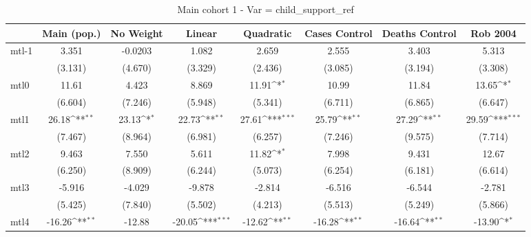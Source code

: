 \documentclass{article}
\begin{document}
{
\def\sym#1{\ifmmode^{#1}\else\(^{#1}\)\fi}
\begin{longtable}{l*{7}{c}}
\caption{Main cohort 1 - Var = child\_support\_ref}\\
\hline\hline\endfirsthead\hline\endhead\hline\endfoot\endlastfoot
                &\multicolumn{1}{c}{Main (pop.)}&\multicolumn{1}{c}{No Weight}&\multicolumn{1}{c}{Linear}&\multicolumn{1}{c}{Quadratic}&\multicolumn{1}{c}{Cases Control}&\multicolumn{1}{c}{Deaths Control}&\multicolumn{1}{c}{Rob 2004}\\
\hline
mtl-1           &    3.351         &  -0.0203         &    1.082         &    2.659         &    2.555         &    3.403         &    5.313         \\
                &  (3.131)         &  (4.670)         &  (3.329)         &  (2.436)         &  (3.085)         &  (3.194)         &  (3.308)         \\
mtl0            &    11.61         &    4.423         &    8.869         &    11.91\sym{*}  &    10.99         &    11.84         &    13.65\sym{*}  \\
                &  (6.604)         &  (7.246)         &  (5.948)         &  (5.341)         &  (6.711)         &  (6.865)         &  (6.647)         \\
mtl1            &    26.18\sym{**} &    23.13\sym{*}  &    22.73\sym{**} &    27.61\sym{***}&    25.79\sym{**} &    27.29\sym{**} &    29.59\sym{***}\\
                &  (7.467)         &  (8.964)         &  (6.981)         &  (6.257)         &  (7.246)         &  (9.575)         &  (7.714)         \\
mtl2            &    9.463         &    7.550         &    5.611         &    11.82\sym{*}  &    7.998         &    9.431         &    12.67         \\
                &  (6.250)         &  (8.909)         &  (6.244)         &  (5.073)         &  (6.254)         &  (6.181)         &  (6.614)         \\
mtl3            &   -5.916         &   -4.029         &   -9.878         &   -2.814         &   -6.516         &   -6.544         &   -2.781         \\
                &  (5.425)         &  (7.840)         &  (5.502)         &  (4.213)         &  (5.513)         &  (5.249)         &  (5.866)         \\
mtl4            &   -16.26\sym{**} &   -12.88         &   -20.05\sym{***}&   -12.62\sym{**} &   -16.28\sym{**} &   -16.64\sym{**} &   -13.90\sym{*}  \\

\end{longtable}}
\end{document}
